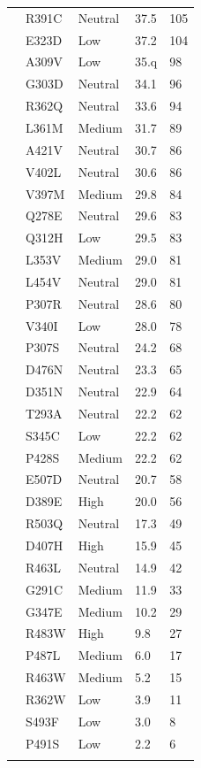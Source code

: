 \documentclass[phd,tocprelim]{cornell}
\begin{document}
\begin{landscape}
\begin{ThreePartTable}
\begin{longtable}[c]{lllll}
&R391C & Neutral & 37.5 & 105 \\
&E323D & Low & 37.2 & 104 \\
&A309V & Low & 35.q & 98 \\
&G303D & Neutral & 34.1 & 96 \\
&R362Q & Neutral & 33.6 & 94 \\
&L361M & Medium & 31.7 & 89 \\
&A421V & Neutral & 30.7 & 86 \\
&V402L & Neutral & 30.6 & 86 \\
&V397M & Medium & 29.8 & 84 \\
&Q278E & Neutral & 29.6 & 83 \\
&Q312H & Low & 29.5& 83 \\
&L353V & Medium & 29.0 & 81 \\
&L454V & Neutral & 29.0 & 81 \\
&P307R & Neutral & 28.6 & 80 \\
&V340I & Low & 28.0 & 78 \\
&P307S & Neutral & 24.2 & 68 \\
&D476N & Neutral & 23.3 & 65 \\
&D351N & Neutral & 22.9 & 64 \\
&T293A & Neutral &  22.2 & 62 \\
&S345C & Low & 22.2 & 62 \\
&P428S & Medium & 22.2 & 62 \\
&E507D & Neutral & 20.7 & 58 \\
&D389E & High & 20.0 & 56 \\
&R503Q & Neutral & 17.3 & 49 \\
&D407H & High & 15.9 & 45 \\
&R463L & Neutral & 14.9 & 42 \\
&G291C & Medium & 11.9 & 33 \\
&G347E & Medium & 10.2 & 29 \\
&R483W & High & 9.8 & 27 \\
&P487L & Medium & 6.0 & 17 \\
&R463W & Medium & 5.2 & 15 \\
&R362W & Low & 3.9 & 11 \\
&S493F & Low &  3.0 & 8 \\
&P491S & Low &  2.2 & 6 \\
	\bottomrule
	\insertTableNotes  %
\end{longtable}
\end{ThreePartTable}
\end{landscape}
\end{document}
